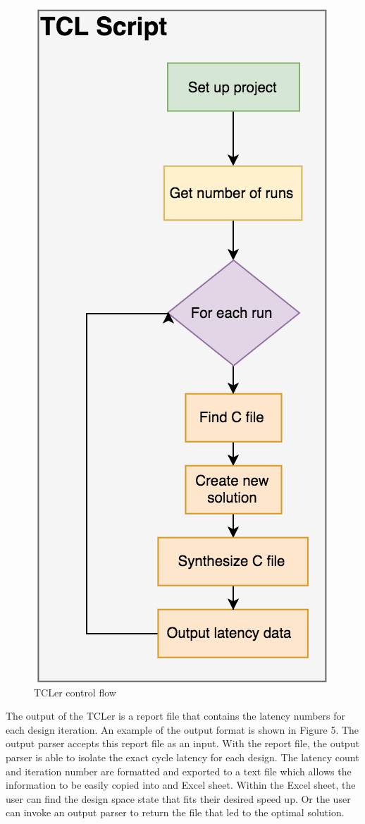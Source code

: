 \documentclass[letterpaper, 10 pt, conference]{IEEEconf}  %
\begin{document}
\begin{figure}[H]
\centering
\includegraphics[scale=.6]{tcler.png} 
\caption{TCLer control flow}
\end{figure}

The output of the TCLer is a report file that contains the latency numbers for each design iteration. An example of the output format is shown in Figure 5. The output parser accepts this report file as an input. With the report file, the output parser is able to isolate the exact cycle latency for each design. The latency count and iteration number are formatted and exported to a text file which allows the information to be easily copied into and Excel sheet. Within the Excel sheet, the user can find the design space state that fits their desired speed up. Or the user can invoke an output parser to return the file that led to the optimal solution.
\end{document}

